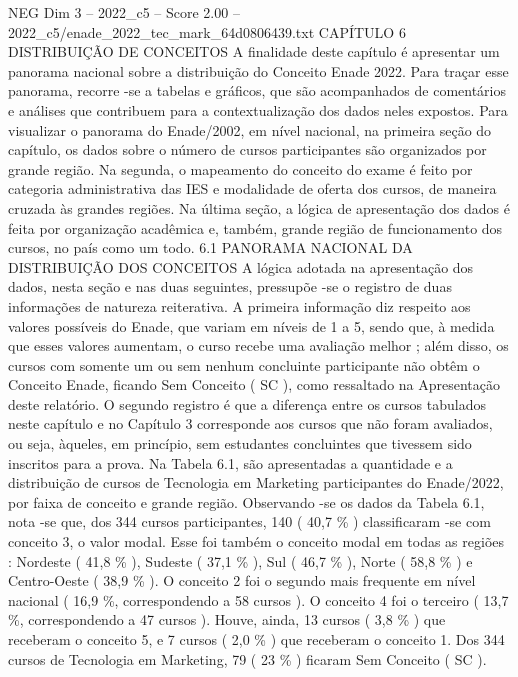 \begin{textsample}{NEG Dim 3 – 2022\_c5 – Score 2.00 – 2022\_c5/enade\_2022\_tec\_mark\_64d0806439.txt}  \label{ex:f3_neg_215}
CAPÍTULO 6 DISTRIBUIÇÃO DE CONCEITOS A finalidade deste capítulo é apresentar um panorama nacional sobre a distribuição do Conceito Enade 2022.
Para traçar esse panorama, recorre -se a tabelas e gráficos, que são acompanhados de comentários e análises que contribuem para a contextualização dos dados neles expostos.
Para visualizar o panorama do Enade/2002, em nível nacional, na primeira seção do capítulo, os dados sobre o número de cursos participantes são organizados por grande região.
Na segunda, o mapeamento do conceito do exame é feito por categoria administrativa das IES e modalidade de oferta dos cursos, de maneira cruzada às grandes regiões.
Na última seção, a lógica de apresentação dos dados é feita por organização acadêmica e, também, grande região de funcionamento dos cursos, no país como um todo. 6.1 PANORAMA NACIONAL DA DISTRIBUIÇÃO DOS CONCEITOS A lógica adotada na apresentação dos dados, nesta seção e nas duas seguintes, pressupõe -se o registro de duas informações de natureza reiterativa.
A primeira informação diz respeito aos valores possíveis do Enade, que variam em níveis de 1 a 5, sendo que, à medida que esses valores aumentam, o curso recebe uma avaliação melhor ; além disso, os cursos com somente um ou sem nenhum concluinte participante não obtêm o Conceito Enade, ficando Sem Conceito ( SC ), como ressaltado na Apresentação deste relatório.
O segundo registro é que a diferença entre os cursos tabulados neste capítulo e no Capítulo 3 corresponde aos cursos que não foram avaliados, ou seja, àqueles, em princípio, sem estudantes concluintes que tivessem sido inscritos para a prova.
Na Tabela 6.1, são apresentadas a quantidade e a distribuição de cursos de Tecnologia em Marketing participantes do Enade/2022, por faixa de conceito e grande região.
Observando -se os dados da Tabela 6.1, nota -se que, dos 344 cursos participantes, 140 ( 40,7 \% ) classificaram -se com conceito 3, o valor modal.
Esse foi também o conceito modal em todas as regiões : Nordeste ( 41,8 \% ), Sudeste ( 37,1 \% ), Sul ( 46,7 \% ), Norte ( 58,8 \% ) e Centro-Oeste ( 38,9 \% ).
O conceito 2 foi o segundo mais frequente em nível nacional ( 16,9 \%, correspondendo a 58 cursos ).
O conceito 4 foi o terceiro ( 13,7 \%, correspondendo a 47 cursos ).
Houve, ainda, 13 cursos ( 3,8 \% ) que receberam o conceito 5, e 7 cursos ( 2,0 \% ) que receberam o conceito 1.
Dos 344 cursos de Tecnologia em Marketing, 79 ( 23 \% ) ficaram Sem Conceito ( SC ).

\end{textsample}
